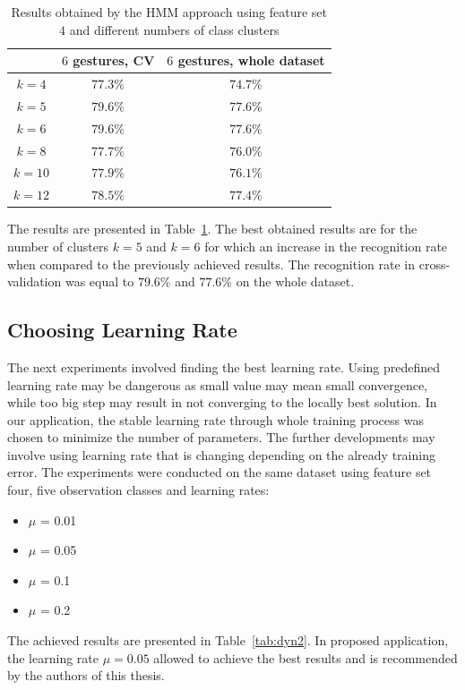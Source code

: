 \begin{table}[htbp!]
\begin{center}
	\label{tab:dynNumber}
	\caption{Results obtained by the HMM approach using feature set $4$ and different numbers of class clusters}
    \begin{tabular}{ccc}
    \hline
    ~                                 & $6$ gestures, CV & $6$ gestures, whole dataset  \\ \hline
	$k = 4$                  	  & $77.3\%$ & $74.7\%$   \\ \hline
    $k = 5$               	  & $79.6\%$ & $77.6\%$   \\ \hline
    $k = 6$                    & $79.6\%$ & $77.6\%$   \\ \hline
    $k = 8$                     & $77.7\%$ & $76.0\%$   \\ \hline
    $k = 10$                    & $77.9\%$ & $76.1\%$   \\ \hline
    $k = 12$                    & $78.5\%$ & $77.4\%$   \\ \hline
    \end{tabular}
\end{center}
\end{table}
The results are presented in Table~\ref{tab:dynNumber}.
The best obtained results are for the number of clusters $k=5$ and $k=6$ for which an increase in the recognition rate when compared to the previously achieved results. 
The recognition rate in cross-validation was equal to $79.6\%$ and $77.6\%$ on the whole dataset. 

\subsection{Choosing Learning Rate}

The next experiments involved finding the best learning rate. 
Using predefined learning rate may be dangerous as small value may mean small convergence, while too big step may result in not converging to the locally best solution. 
In our application, the stable learning rate through whole training process was chosen to minimize the number of parameters. 
The further developments may involve using learning rate that is changing depending on the already training error.
The experiments were conducted on the same dataset using feature set four, five observation classes and learning rates:
\begin{itemize}
\item $\mu$ = 0.01
\item $\mu$ = 0.05
\item $\mu$ = 0.1
\item $\mu$ = 0.2
\end{itemize}
The achieved results are presented in Table~\ref{tab:dyn2}.
In proposed application, the learning rate $\mu = 0.05$ allowed to achieve the best results and is recommended by the authors of this thesis. 

